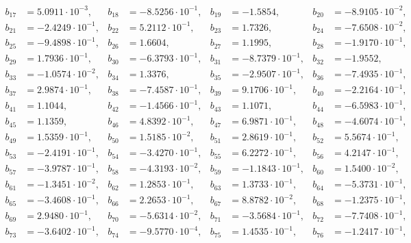 \begin{align*}
b_{ 17 } &= 5.0911 \cdot 10^{ -3 }, & b_{ 18 } &= -8.5256 \cdot 10^{ -1 }, & b_{ 19 } &= -1.5854, & b_{ 20 } &= -8.9105 \cdot 10^{ -2 },\\ 
b_{ 21 } &= -2.4249 \cdot 10^{ -1 }, & b_{ 22 } &= 5.2112 \cdot 10^{ -1 }, & b_{ 23 } &= 1.7326, & b_{ 24 } &= -7.6508 \cdot 10^{ -2 },\\ 
b_{ 25 } &= -9.4898 \cdot 10^{ -1 }, & b_{ 26 } &= 1.6604, & b_{ 27 } &= 1.1995, & b_{ 28 } &= -1.9170 \cdot 10^{ -1 },\\ 
b_{ 29 } &= 1.7936 \cdot 10^{ -1 }, & b_{ 30 } &= -6.3793 \cdot 10^{ -1 }, & b_{ 31 } &= -8.7379 \cdot 10^{ -1 }, & b_{ 32 } &= -1.9552,\\ 
b_{ 33 } &= -1.0574 \cdot 10^{ -2 }, & b_{ 34 } &= 1.3376, & b_{ 35 } &= -2.9507 \cdot 10^{ -1 }, & b_{ 36 } &= -7.4935 \cdot 10^{ -1 },\\ 
b_{ 37 } &= 2.9874 \cdot 10^{ -1 }, & b_{ 38 } &= -7.4587 \cdot 10^{ -1 }, & b_{ 39 } &= 9.1706 \cdot 10^{ -1 }, & b_{ 40 } &= -2.2164 \cdot 10^{ -1 },\\ 
b_{ 41 } &= 1.1044, & b_{ 42 } &= -1.4566 \cdot 10^{ -1 }, & b_{ 43 } &= 1.1071, & b_{ 44 } &= -6.5983 \cdot 10^{ -1 },\\ 
b_{ 45 } &= 1.1359, & b_{ 46 } &= 4.8392 \cdot 10^{ -1 }, & b_{ 47 } &= 6.9871 \cdot 10^{ -1 }, & b_{ 48 } &= -4.6074 \cdot 10^{ -1 },\\ 
b_{ 49 } &= 1.5359 \cdot 10^{ -1 }, & b_{ 50 } &= 1.5185 \cdot 10^{ -2 }, & b_{ 51 } &= 2.8619 \cdot 10^{ -1 }, & b_{ 52 } &= 5.5674 \cdot 10^{ -1 },\\ 
b_{ 53 } &= -2.4191 \cdot 10^{ -1 }, & b_{ 54 } &= -3.4270 \cdot 10^{ -1 }, & b_{ 55 } &= 6.2272 \cdot 10^{ -1 }, & b_{ 56 } &= 4.2147 \cdot 10^{ -1 },\\ 
b_{ 57 } &= -3.9787 \cdot 10^{ -1 }, & b_{ 58 } &= -4.3193 \cdot 10^{ -2 }, & b_{ 59 } &= -1.1843 \cdot 10^{ -1 }, & b_{ 60 } &= 1.5400 \cdot 10^{ -2 },\\ 
b_{ 61 } &= -1.3451 \cdot 10^{ -2 }, & b_{ 62 } &= 1.2853 \cdot 10^{ -1 }, & b_{ 63 } &= 1.3733 \cdot 10^{ -1 }, & b_{ 64 } &= -5.3731 \cdot 10^{ -1 },\\ 
b_{ 65 } &= -3.4608 \cdot 10^{ -1 }, & b_{ 66 } &= 2.2653 \cdot 10^{ -1 }, & b_{ 67 } &= 8.8782 \cdot 10^{ -2 }, & b_{ 68 } &= -1.2375 \cdot 10^{ -1 },\\ 
b_{ 69 } &= 2.9480 \cdot 10^{ -1 }, & b_{ 70 } &= -5.6314 \cdot 10^{ -2 }, & b_{ 71 } &= -3.5684 \cdot 10^{ -1 }, & b_{ 72 } &= -7.7408 \cdot 10^{ -1 },\\ 
b_{ 73 } &= -3.6402 \cdot 10^{ -1 }, & b_{ 74 } &= -9.5770 \cdot 10^{ -4 }, & b_{ 75 } &= 1.4535 \cdot 10^{ -1 }, & b_{ 76 } &= -1.2417 \cdot 10^{ -1 },\\ 

\end{align*}
